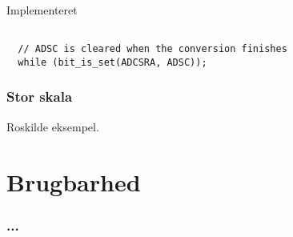 \documentclass{beamer}
\begin{document}
\begin{frame}[fragile]{Implementeret}

  \begin{example}

\begin{verbatim}

  // ADSC is cleared when the conversion finishes
  while (bit_is_set(ADCSRA, ADSC));

\end{verbatim}
  \end{example}

\end{frame}

\begin{frame}
  \frametitle{Stor skala}

  Roskilde eksempel.

\end{frame}



\section{Brugbarhed}

\begin{frame}
  \frametitle{...}
  
\end{frame}
\end{document}
